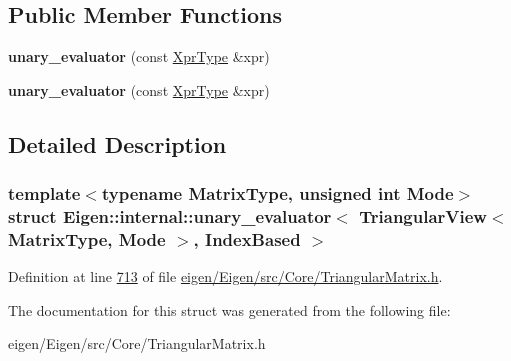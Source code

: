 \subsection*{Public Member Functions}
\begin{DoxyCompactItemize}
\item 
\mbox{\label{struct_eigen_1_1internal_1_1unary__evaluator_3_01_triangular_view_3_01_matrix_type_00_01_mode_01_4_00_01_index_based_01_4_af39191a25a16e28e69f61de2fc305808}} 
{\bfseries unary\+\_\+evaluator} (const \hyperlink{group___core___module_class_eigen_1_1_triangular_view}{Xpr\+Type} \&xpr)
\item 
\mbox{\label{struct_eigen_1_1internal_1_1unary__evaluator_3_01_triangular_view_3_01_matrix_type_00_01_mode_01_4_00_01_index_based_01_4_af39191a25a16e28e69f61de2fc305808}} 
{\bfseries unary\+\_\+evaluator} (const \hyperlink{group___core___module_class_eigen_1_1_triangular_view}{Xpr\+Type} \&xpr)
\end{DoxyCompactItemize}


\subsection{Detailed Description}
\subsubsection*{template$<$typename Matrix\+Type, unsigned int Mode$>$\newline
struct Eigen\+::internal\+::unary\+\_\+evaluator$<$ Triangular\+View$<$ Matrix\+Type, Mode $>$, Index\+Based $>$}



Definition at line \hyperlink{eigen_2_eigen_2src_2_core_2_triangular_matrix_8h_source_l00713}{713} of file \hyperlink{eigen_2_eigen_2src_2_core_2_triangular_matrix_8h_source}{eigen/\+Eigen/src/\+Core/\+Triangular\+Matrix.\+h}.



The documentation for this struct was generated from the following file\+:\begin{DoxyCompactItemize}
\item 
eigen/\+Eigen/src/\+Core/\+Triangular\+Matrix.\+h\end{DoxyCompactItemize}
